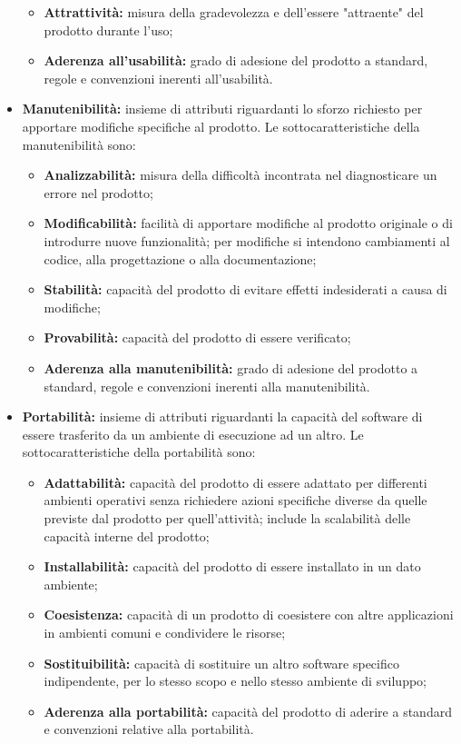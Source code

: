 \begin{itemize}
\begin{itemize}
              \item \textbf{Attrattività:} misura della gradevolezza e dell'essere "attraente" del prodotto durante l'uso;
              \item \textbf{Aderenza all'usabilità:} grado di adesione del prodotto a standard, regole e convenzioni inerenti all'usabilità.
          \end{itemize}
    \item \textbf{Manutenibilità:} insieme di attributi riguardanti lo sforzo richiesto per apportare modifiche specifiche al prodotto.
          Le sottocaratteristiche della manutenibilità sono:
          \begin{itemize}
              \item \textbf{Analizzabilità:} misura della difficoltà incontrata nel diagnosticare un errore nel prodotto;
              \item \textbf{Modificabilità:} facilità di apportare modifiche al prodotto originale o di introdurre nuove funzionalità; per modifiche si intendono cambiamenti al codice, alla progettazione o alla documentazione;
              \item \textbf{Stabilità:} capacità del prodotto di evitare effetti indesiderati a causa di modifiche;
              \item \textbf{Provabilità:} capacità del prodotto di essere verificato;
              \item \textbf{Aderenza alla manutenibilità:} grado di adesione del prodotto a standard, regole e convenzioni inerenti alla manutenibilità.
          \end{itemize}
    \item \textbf{Portabilità:} insieme di attributi riguardanti la capacità del software di essere trasferito da un ambiente di esecuzione ad un altro.
          Le sottocaratteristiche della portabilità sono:
          \begin{itemize}
              \item \textbf{Adattabilità:} capacità del prodotto di essere adattato per differenti ambienti operativi senza richiedere azioni specifiche diverse da quelle previste dal prodotto per quell'attività; include la scalabilità delle capacità interne del prodotto;
              \item \textbf{Installabilità:} capacità del prodotto di essere installato in un dato ambiente;
              \item \textbf{Coesistenza:} capacità di un prodotto di coesistere con altre applicazioni in ambienti comuni e condividere le risorse;
              \item \textbf{Sostituibilità:} capacità di sostituire un altro software specifico indipendente, per lo stesso scopo e nello stesso ambiente di sviluppo;
              \item \textbf{Aderenza alla portabilità:} capacità del prodotto di aderire a standard e convenzioni relative alla portabilità.
          \end{itemize}
\end{itemize}


